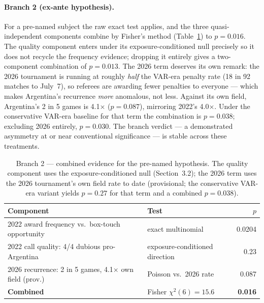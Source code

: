 \documentclass[11pt,a4paper]{article}
\newcommand{\pv}[1]{\ensuremath{p = #1}}
\begin{document}
\paragraph{Branch 2 (ex-ante hypothesis).} For a pre-named subject the raw exact
test applies, and the three quasi-independent components combine by Fisher's method
(Table~\ref{tab:fisher}) to \pv{0.016}. The quality component enters under its
exposure-conditioned null precisely so it does not recycle the frequency evidence;
dropping it entirely gives a two-component combination of \pv{0.013}. The 2026 term
deserves its own remark:
the 2026 tournament is running at roughly \emph{half} the VAR-era penalty rate (18 in
92 matches to July~7), so referees are awarding fewer penalties to everyone ---
which makes Argentina's recurrence \emph{more} anomalous, not less. Against its own
field, Argentina's 2 in 5 games is 4.1$\times$ (\pv{0.087}), mirroring 2022's
4.0$\times$. Under the conservative VAR-era baseline for that term the combination
is \pv{0.038}; excluding 2026 entirely, \pv{0.030}. The branch verdict --- a
demonstrated asymmetry at or near conventional significance --- is stable across
these treatments.

\begin{table}[H]
\centering
\small
\caption{Branch 2 --- combined evidence for the pre-named hypothesis. The quality
component uses the exposure-conditioned null (Section~3.2); the 2026 term uses the
2026 tournament's own field rate to date (provisional; the conservative VAR-era
variant yields $p = 0.27$ for that term and a combined $p = 0.038$).}
\label{tab:fisher}
\begin{tabular}{llr}
\toprule
Component & Test & $p$ \\
\midrule
2022 award frequency vs.\ box-touch opportunity & exact multinomial & 0.0204 \\
2022 call quality: 4/4 dubious pro-Argentina & exposure-conditioned direction & 0.23 \\
2026 recurrence: 2 in 5 games, 4.1$\times$ own field (prov.) & Poisson vs.\ 2026 rate & 0.087 \\
\midrule
\textbf{Combined} & Fisher $\chi^2(6) = 15.6$ & \textbf{0.016} \\
\bottomrule
\end{tabular}
\end{table}
\end{document}
